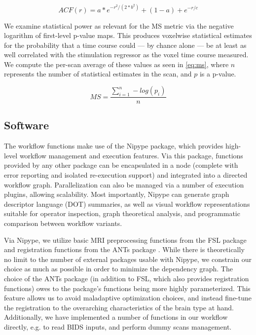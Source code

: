 \begin{equation} \label{eq:acf}
        ACF(r)
        = a * e^{ -r^{2}/ (2 * b^{2}) } + (1 - a) + e^{-r/c}
\end{equation}

We examine statistical power as relevant for the MS metric via the negative logarithm of first-level p-value maps.
This produces voxelwise statistical estimates for the probability that a time course could --- by chance alone --- be at least as well correlated with the stimulation regressor as the voxel time course measured.
We compute the per-scan average of these values as seen in \cref{eq:ms}, where $n$ represents the number of statistical estimates in the scan, and $p$ is a p-value.

\begin{equation} \label{eq:ms}
        M\!S = \frac{\sum_{i=1}^n -log(p_i)}{n}
\end{equation}

\subsection{Software}

The workflow functions make use of the Nipype \cite{nipype} package, which provides high-level workflow management and execution features.
Via this package, functions provided by any other package can be encapsulated in a node (complete with error reporting and isolated re-execution support) and integrated into a directed workflow graph.
Parallelization can also be managed via a number of execution plugins, allowing scalability.
Most importantly, Nipype can generate graph descriptor language (DOT) summaries, as well as visual workflow representations suitable for operator inspection, graph theoretical analysis, and programmatic comparison between workflow variants.

Via Nipype, we utilize basic MRI preprocessing functions from the FSL package \cite{fsl} and registration functions from the ANTs package \cite{ants}.
While there is theoretically no limit to the number of external packages usable with Nipype, we constrain our choice as much as possible in order to minimize the dependency graph.
The choice of the ANTs package (in addition to FSL, which also provides registration functions) owes to the package's functions being more highly parameterized.
This feature allows us to avoid maladaptive optimization choices, and instead fine-tune the registration to the overarching characteristics of the brain type at hand.
Additionally, we have implemented a number of functions in our workflow directly, e.g. to read BIDS \cite{bids} inputs, and perform dummy scans management.


